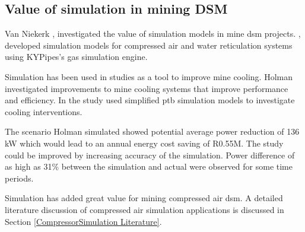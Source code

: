 	\subsection{Value of simulation in mining DSM}
	Van Niekerk \cite{van2013value},\cite{vanNiekerk2012Value} investigated the value of simulation models in mine \gls{dsm} projects. \cite{van2013value},\cite{vanNiekerk2012Value} developed simulation models for compressed air and water reticulation systems using KYPipes's gas simulation engine. 
	\par
	Simulation has been used in studies as a tool to improve mine cooling. Holman \cite{Holman2014Masters} investigated improvements to mine cooling systems that improve performance and efficiency. In the study \cite{Holman2014Masters} used simplified \gls{ptb}  simulation models to investigate cooling interventions.
	\par 
	The scenario Holman simulated showed potential  average power reduction of 136 kW  which would lead to an annual energy cost saving of R0.55M. The study could be improved by increasing accuracy of the simulation. Power difference of as high as 31\% between the simulation and actual were observed for some time periods.
	\par
	Simulation has added great value for mining compressed air \gls{dsm}. A detailed literature discussion of compressed air simulation applications is discussed in Section  \ref{CompressorSimulation Literature}.
